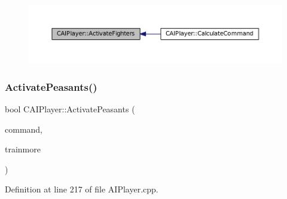 \begin{figure}[H]
\begin{center}
\leavevmode
\includegraphics[width=350pt]{classCAIPlayer_a4216d7e76315234a4fe22fb3a0a89c1d_icgraph}
\end{center}
\end{figure}
\hypertarget{classCAIPlayer_a3fab1c955fd68bb53fa80bb1872d2819}{}\label{classCAIPlayer_a3fab1c955fd68bb53fa80bb1872d2819} 
\subsubsection{\texorpdfstring{Activate\+Peasants()}{ActivatePeasants()}}
{\footnotesize\ttfamily bool C\+A\+I\+Player\+::\+Activate\+Peasants (\begin{DoxyParamCaption}\item[{\hyperlink{structSPlayerCommandRequest}{S\+Player\+Command\+Request} \&}]{command,  }\item[{bool}]{trainmore }\end{DoxyParamCaption})\hspace{0.3cm}{\ttfamily [protected]}}



Definition at line 217 of file A\+I\+Player.\+cpp.



